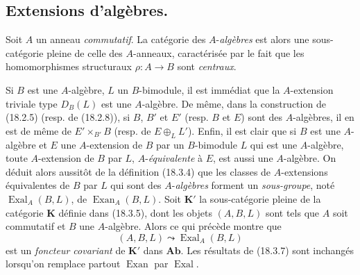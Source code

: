 \subsection{Extensions d'algèbres.}
\label{subsection:0.18.4-fr}

\begin{env}[18.4.1]
\label{0.18.4.1-fr}
Soit $A$ un anneau \emph{commutatif}. La catégorie des $A$-\emph{algèbres} est
alors une sous-catégorie pleine de celle des $A$-anneaux, caractérisée par le
fait que les homomorphismes structuraux $\rho:A\to B$ sont \emph{centraux}.

Si $B$ est une $A$-algèbre, $L$ un $B$-bimodule, il est immédiat que la
$A$-extension triviale type $D_B(L)$ est une $A$-algèbre. De même, dans la
construction de (18.2.5) (resp. de (18.2.8)), si $B$, $B'$ et $E'$ (resp.
$B$ et $E$) sont des $A$-algèbres, il en est de même de
$E'\times_{B'}B$ (resp. de $E\oplus_LL'$). Enfin, il est clair que si $B$ est
une $A$-algèbre et $E$ une $A$-extension de $B$ par un $B$-bimodule $L$ qui
est une $A$-algèbre, toute $A$-extension de $B$ par $L$, $A$-\emph{équivalente}
à $E$, est aussi une $A$-algèbre. On déduit alors aussitôt de la définition
(18.3.4) que les classes de $A$-extensions équivalentes de $B$ par $L$ qui
sont des $A$-\emph{algèbres} forment un \emph{sous-groupe}, noté
$\operatorname{Exal}_A(B,L)$, de $\operatorname{Exan}_A(B,L)$. Soit
$\boldsymbol{K}'$ la sous-catégorie pleine de la catégorie $\boldsymbol{K}$ définie dans
(18.3.5), dont les objets $(A,B,L)$ sont tels que $A$ soit commutatif et $B$
une $A$-algèbre. Alors ce qui précède montre que
\[
  (A,B,L)\leadsto\operatorname{Exal}_A(B,L)
\]
est un \emph{foncteur covariant} de $\boldsymbol{K}'$ dans $\boldsymbol{Ab}$. Les
résultats de (18.3.7) sont inchangés lorsqu'on remplace partout
$\operatorname{Exan}$ par $\operatorname{Exal}$.
\end{env}

